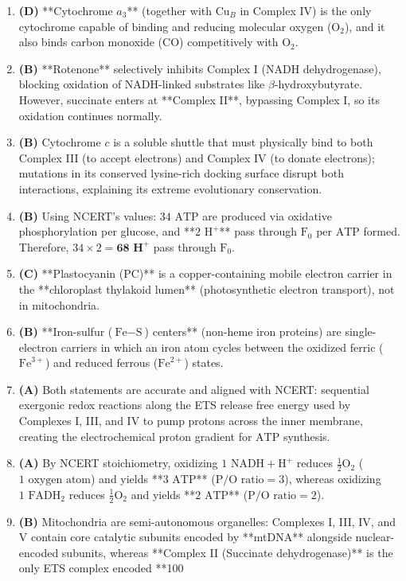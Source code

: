 \documentclass[11pt, a4paper]{article}
\begin{document}
\begin{enumerate}[label=\textbf{\arabic*.}]
\item \textbf{(D)} **Cytochrome $a_3$** (together with $\text{Cu}_B$ in Complex IV) is the only cytochrome capable of binding and reducing molecular oxygen ($\text{O}_2$), and it also binds carbon monoxide ($\text{CO}$) competitively with $\text{O}_2$.

\item \textbf{(B)} **Rotenone** selectively inhibits Complex I ($\text{NADH}$ dehydrogenase), blocking oxidation of $\text{NADH}$-linked substrates like $\beta$-hydroxybutyrate. However, succinate enters at **Complex II**, bypassing Complex I, so its oxidation continues normally.

\item \textbf{(B)} Cytochrome $c$ is a soluble shuttle that must physically bind to both Complex III (to accept electrons) and Complex IV (to donate electrons); mutations in its conserved lysine-rich docking surface disrupt both interactions, explaining its extreme evolutionary conservation.

\item \textbf{(B)} Using NCERT's values: $34\text{ ATP}$ are produced via oxidative phosphorylation per glucose, and **$2\text{ H}^+$** pass through $\text{F}_0$ per $\text{ATP}$ formed. Therefore, $34 \times 2 = \mathbf{68\text{ H}^+}$ pass through $\text{F}_0$.

\item \textbf{(C)} **Plastocyanin ($\text{PC}$)** is a copper-containing mobile electron carrier in the **chloroplast thylakoid lumen** (photosynthetic electron transport), not in mitochondria.

\item \textbf{(B)} **Iron-sulfur ($\text{Fe}-\text{S}$) centers** (non-heme iron proteins) are single-electron carriers in which an iron atom cycles between the oxidized ferric ($\text{Fe}^{3+}$) and reduced ferrous ($\text{Fe}^{2+}$) states.

\item \textbf{(A)} Both statements are accurate and aligned with NCERT: sequential exergonic redox reactions along the ETS release free energy used by Complexes I, III, and IV to pump protons across the inner membrane, creating the electrochemical proton gradient for $\text{ATP}$ synthesis.

\item \textbf{(A)} By NCERT stoichiometry, oxidizing $1\text{ NADH} + \text{H}^+$ reduces $\frac{1}{2}\text{O}_2$ ($1\text{ oxygen atom}$) and yields **$3\text{ ATP}$** ($\text{P/O ratio} = 3$), whereas oxidizing $1\text{ FADH}_2$ reduces $\frac{1}{2}\text{O}_2$ and yields **$2\text{ ATP}$** ($\text{P/O ratio} = 2$).

\item \textbf{(B)} Mitochondria are semi-autonomous organelles: Complexes I, III, IV, and V contain core catalytic subunits encoded by **mtDNA** alongside nuclear-encoded subunits, whereas **Complex II (Succinate dehydrogenase)** is the only ETS complex encoded **100%

\end{enumerate}
\end{document}
